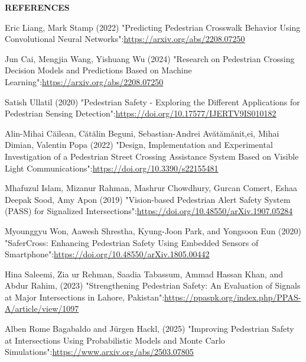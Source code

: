 \documentclass[a4paper, 12pt]{report}
\begin{document}
\vspace*{0.3cm} %

\begin{center}
{\LARGE \textbf{REFERENCES}}
\end{center}
{}




\noindent [1]  Eric Liang, Mark Stamp (2022) "Predicting Pedestrian Crosswalk Behavior Using Convolutional Neural Networks":\url{https://arxiv.org/abs/2208.07250}

\noindent [2] Jun Cai, Mengjia Wang, Yishuang Wu (2024) "Research on Pedestrian Crossing Decision Models and Predictions Based on Machine Learning":\url{https://arxiv.org/abs/2208.07250}


 

\noindent [3]  Satish Ullatil (2020) "Pedestrian Safety - Exploring the Different Applications for Pedestrian Sensing Detection":\url{https://doi.org/10.17577/IJERTV9IS010182}



\noindent [4] Alin-Mihai Căilean, Cătălin Beguni, Sebastian-Andrei Avătămănit,ei, Mihai Dimian, Valentin Popa (2022) "Design, Implementation and Experimental Investigation of a Pedestrian Street Crossing Assistance System Based on Visible Light Communications":\url{https://doi.org/10.3390/s22155481}

 

\noindent [5] Mhafuzul Islam, Mizanur Rahman, Mashrur Chowdhury, Gurcan Comert, Eshaa Deepak Sood, Amy Apon (2019) "Vision-based Pedestrian Alert Safety System (PASS) for Signalized Intersections":\url{https://doi.org/10.48550/arXiv.1907.05284}


\noindent [6] Myounggyu Won, Aawesh Shrestha, Kyung-Joon Park, and Yongsoon Eun (2020) "SaferCross: Enhancing Pedestrian Safety Using Embedded Sensors of Smartphone":\url{https://doi.org/10.48550/arXiv.1805.00442}


\noindent [7] Hina Saleemi, Zia ur Rehman, Saadia Tabassum, Ammad Hassan Khan, and Abdur Rahim, (2023) "Strengthening Pedestrian Safety: An Evaluation of Signals at Major Intersections in Lahore, Pakistan":\url{https://ppaspk.org/index.php/PPAS-A/article/view/1097}


\noindent [8] Alben Rome Bagabaldo and Jürgen Hackl, (2025) "Improving Pedestrian Safety at Intersections Using Probabilistic Models and Monte Carlo Simulations":\url{https://www.arxiv.org/abs/2503.07805}
\end{document}
